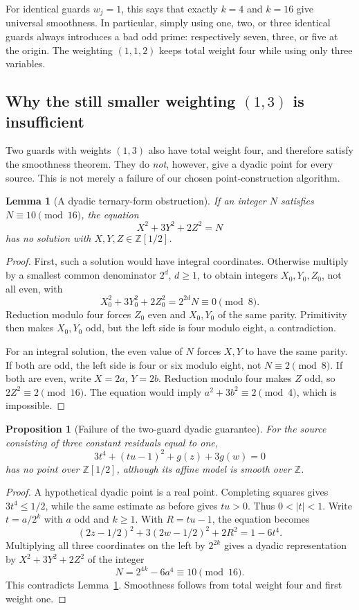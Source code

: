 \documentclass[11pt,a4paper]{article}
\newtheorem{lemma}[theorem]{Lemma}
\newtheorem{proposition}[theorem]{Proposition}
\theoremstyle{definition}
\theoremstyle{remark}
\newcommand{\Z}{\mathbb Z}
\newcommand{\guard}{g}
\begin{document}
For identical guards $w_j=1$, this says that exactly $k=4$ and $k=16$
give universal smoothness. In particular, simply using one, two, or three
identical guards always introduces a bad odd prime: respectively seven,
three, or five at the origin. The weighting $(1,1,2)$ keeps total weight
four while using only three variables.

\subsection{Why the still smaller weighting \texorpdfstring{$(1,3)$}{(1,3)} is insufficient}

Two guards with weights $(1,3)$ also have total weight four, and therefore
satisfy the smoothness theorem. They do \emph{not}, however, give a dyadic
point for every source. This is not merely a failure of our chosen
point-construction algorithm.

\begin{lemma}[A dyadic ternary-form obstruction]\label{sdf:lem:dyadic-obstruction}
If an integer $N$ satisfies $N\equiv10\pmod{16}$, the equation
\[
 X^2+3Y^2+2Z^2=N
\]
has no solution with $X,Y,Z\in\Z[1/2]$.
\end{lemma}
\begin{proof}
First, such a solution would have integral coordinates. Otherwise multiply
by a smallest common denominator $2^d$, $d\ge1$, to obtain integers
$X_0,Y_0,Z_0$, not all even, with
\[
 X_0^2+3Y_0^2+2Z_0^2=2^{2d}N\equiv0\pmod8.
\]
Reduction modulo four forces $Z_0$ even and $X_0,Y_0$ of the same parity.
Primitivity then makes $X_0,Y_0$ odd, but the left side is four modulo
eight, a contradiction.

For an integral solution, the even value of $N$ forces $X,Y$ to have the
same parity. If both are odd, the left side is four or six modulo eight,
not $N\equiv2\pmod8$. If both are even, write $X=2a$, $Y=2b$.
Reduction modulo four makes $Z$ odd, so $2Z^2\equiv2\pmod{16}$.
The equation would imply $a^2+3b^2\equiv2\pmod4$, which is impossible.
\end{proof}

\begin{proposition}[Failure of the two-guard dyadic guarantee]\label{sdf:prop:two-guard}
For the source consisting of three constant residuals equal to one,
\begin{equation}\label{sdf:eq:bad-weighted}
 3t^4+(tu-1)^2+\guard(z)+3\guard(w)=0
\end{equation}
has no point over $\Z[1/2]$, although its affine model is smooth over $\Z$.
\end{proposition}
\begin{proof}
A hypothetical dyadic point is a real point. Completing squares gives
$3t^4\le1/2$, while the same estimate as before gives $tu>0$.
Thus $0<|t|<1$. Write $t=a/2^k$ with $a$ odd and $k\ge1$.
With $R=tu-1$, the equation becomes
\[
 (2z-1/2)^2+3(2w-1/2)^2+2R^2=1-6t^4.
\]
Multiplying all three coordinates on the left by $2^{2k}$ gives a dyadic
representation by $X^2+3Y^2+2Z^2$ of the integer
\[
 N=2^{4k}-6a^4\equiv10\pmod{16}.
\]
This contradicts Lemma~\ref{sdf:lem:dyadic-obstruction}. Smoothness follows
from total weight four and first weight one.
\end{proof}
\end{document}
